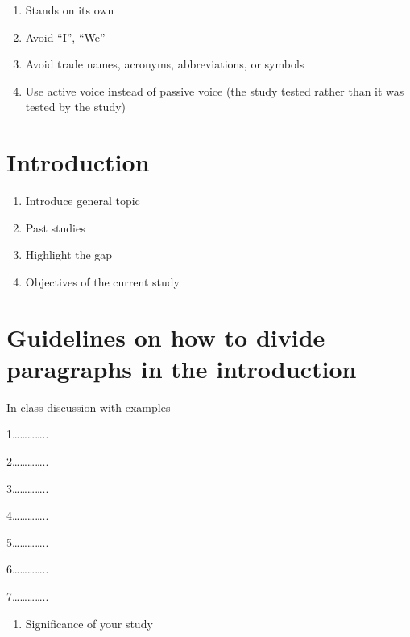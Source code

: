 \documentclass[
  letterpaper,
  DIV=11,
  numbers=noendperiod]{scrreprt}
\providecommand{\tightlist}{%
  \setlength{\itemsep}{0pt}\setlength{\parskip}{0pt}}\usepackage{longtable,booktabs,array}
\begin{document}
\begin{enumerate}
\def\labelenumi{\arabic{enumi}.}
\item
  Stands on its own
\item
  Avoid ``I'', ``We''
\item
  Avoid trade names, acronyms, abbreviations, or symbols
\item
  Use active voice instead of passive voice (the study tested rather
  than it was tested by the study)
\end{enumerate}


\chapter{Introduction}\label{introduction}

\begin{enumerate}
\def\labelenumi{\arabic{enumi}.}
\item
  Introduce general topic
\item
  Past studies
\item
  Highlight the gap
\item
  Objectives of the current study
\end{enumerate}


\chapter{Guidelines on how to divide paragraphs in the
introduction}\label{guidelines-on-how-to-divide-paragraphs-in-the-introduction}

In class discussion with examples

1\ldots\ldots\ldots\ldots..

2\ldots\ldots\ldots\ldots..

3\ldots\ldots\ldots\ldots..

4\ldots\ldots\ldots\ldots..

5\ldots\ldots\ldots\ldots..

6\ldots\ldots\ldots\ldots..

7\ldots\ldots\ldots\ldots..

\begin{enumerate}
\def\labelenumi{\arabic{enumi}.}
\setcounter{enumi}{7}
\tightlist
\item
  Significance of your study
\end{enumerate}
\end{document}
